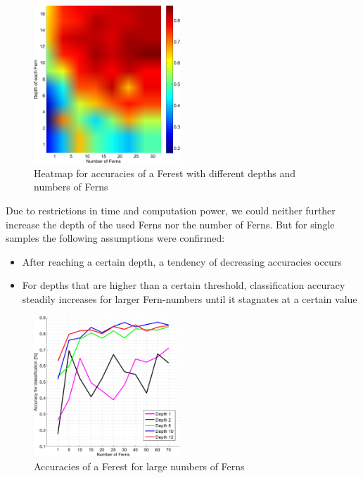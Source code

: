 \documentclass[twocolumn]{article}
\begin{document}
\begin{figure}[h] 
\centering
\includegraphics[width=0.49\textwidth]{Diagrams/heatmap_randFerns_16_30}
\caption{Heatmap for accuracies of a Ferest with different depths and numbers of Ferns}
\label{ferest_heatmap}
\end{figure}

Due to restrictions in time and computation power, we could neither further increase the depth of the used Ferns nor the number of Ferns. But for single samples the following assumptions were confirmed: 
\begin{itemize}
\item After reaching a certain depth, a tendency of decreasing accuracies occurs
\item For depths that are higher than a certain threshold, classification accuracy steadily increases for larger Fern-numbers until it stagnates at a certain value
\end{itemize} 

\begin{figure}[h] 
\centering
\includegraphics[width=0.49\textwidth]{Diagrams/accuracies_RandFerns_12_70}
\caption{Accuracies of a Ferest for large numbers of Ferns}
\label{ferest_accuracies}
\end{figure}
\end{document}
